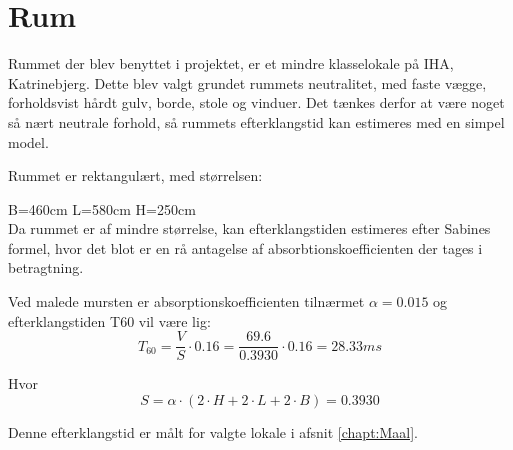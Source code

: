 \clearpage
\section{Rum}

Rummet der blev benyttet i projektet, er et mindre klasselokale på IHA, Katrinebjerg. 
Dette blev valgt grundet rummets neutralitet, med faste vægge, forholdsvist hårdt gulv, borde, stole og vinduer. Det tænkes derfor at være noget så nært neutrale forhold, så rummets efterklangstid kan estimeres med en simpel model.

Rummet er rektangulært, med størrelsen:

B=460cm \hspace{3cm}
L=580cm \hspace{3cm}
H=250cm\\

Da rummet er af mindre størrelse, kan efterklangstiden estimeres efter Sabines formel, hvor det blot er en rå antagelse af absorbtionskoefficienten der tages i betragtning. 

Ved malede mursten er absorptionskoefficienten tilnærmet $\alpha=0.015$ \cite{Attenuation} og efterklangstiden T60 vil være lig:
\begin{equation}\label{lign:T60}
	T_{60}=\frac{V}{S} \cdot 0.16=\frac{69.6}{0.3930} \cdot 0.16=28.33 ms
\end{equation}

Hvor
\begin{equation}
	S=\alpha \cdot (2 \cdot H + 2 \cdot L + 2 \cdot B) = 0.3930
\end{equation}

Denne efterklangstid er målt for valgte lokale i afsnit \ref{chapt:Maal}.
